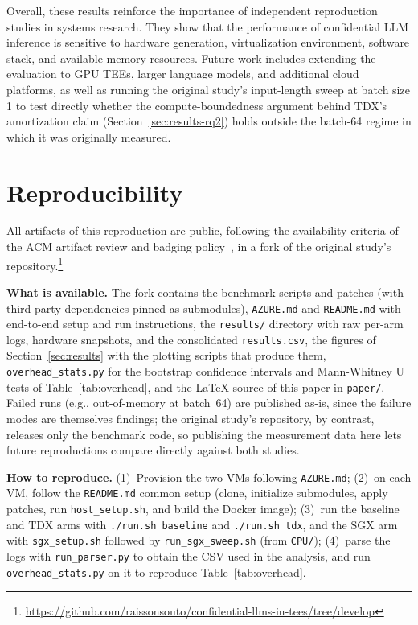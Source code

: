 \documentclass[sigconf]{acmart}
\begin{document}
Overall, these results reinforce the importance of independent reproduction studies in
systems research. They show that the performance of confidential LLM inference is
sensitive to hardware generation, virtualization environment, software stack, and
available memory resources. Future work includes extending the evaluation to GPU TEEs,
larger language models, and additional cloud platforms, as well as running the
original study's input-length sweep at batch size 1 to test directly whether the
compute-boundedness argument behind TDX's amortization claim (Section~\ref{sec:results-rq2})
holds outside the batch-64 regime in which it was originally measured.

\section{Reproducibility}
\label{sec:reproducibility}

All artifacts of this reproduction are public, following the availability criteria of
the ACM artifact review and badging policy~\cite{acm_badging}, in a fork of the
original study's repository.\footnote{\url{https://github.com/raissonsouto/confidential-llms-in-tees/tree/develop}}

\textbf{What is available.} The fork contains the benchmark scripts and patches
(with third-party dependencies pinned as submodules), \texttt{AZURE.md} and
\texttt{README.md} with end-to-end setup and run instructions, the \texttt{results/}
directory with raw per-arm logs, hardware snapshots, and the consolidated
\texttt{results.csv}, the figures of Section~\ref{sec:results} with the plotting
scripts that produce them, \texttt{overhead\_stats.py} for the bootstrap confidence
intervals and Mann-Whitney U tests of Table~\ref{tab:overhead}, and the \LaTeX{}
source of this paper in \texttt{paper/}.
Failed runs (e.g., out-of-memory at batch~64) are published as-is, since the failure
modes are themselves findings; the original study's repository, by contrast, releases
only the benchmark code, so publishing the measurement data here lets future
reproductions compare directly against both studies.

\begin{sloppypar}
\textbf{How to reproduce.} (1)~Provision the two VMs following \texttt{AZURE.md};
(2)~on each VM, follow the \texttt{README.md} common setup (clone, initialize
submodules, apply patches, run \texttt{host\_setup.sh}, and build the Docker image);
(3)~run the baseline and TDX arms with \texttt{./run.sh baseline} and
\texttt{./run.sh tdx}, and the SGX arm with \texttt{sgx\_setup.sh} followed by
\texttt{run\_sgx\_sweep.sh} (from \texttt{CPU/}); (4)~parse the logs with
\texttt{run\_parser.py} to obtain the CSV used in the analysis, and run
\texttt{overhead\_stats.py} on it to reproduce Table~\ref{tab:overhead}.
\end{sloppypar}
\end{document}
